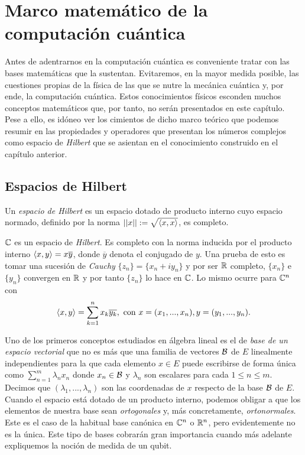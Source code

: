 \chapter{Marco matemático de la computación cuántica}

Antes de adentrarnos en la computación cuántica es conveniente tratar con las bases matemáticas que la sustentan. Evitaremos, en la mayor medida posible, las cuestiones propias de la física de las que se nutre la mecánica cuántica y, por ende, la computación cuántica. Estos conocimientos físicos esconden muchos conceptos matemáticos que, por tanto, no serán presentados en este capítulo. Pese a ello, es idóneo ver los cimientos de dicho marco teórico que podemos resumir en las propiedades y operadores que presentan los números complejos como espacio de \textit{Hilbert} que se asientan en el conocimiento construido en el capítulo anterior.

\section{Espacios de Hilbert}
\begin{definition} Un \textit{espacio de Hilbert} es un espacio dotado de producto interno cuyo espacio normado, definido por la norma $\left|\left|x\right|\right|:=\sqrt{\langle x,x\rangle}$, es completo.
\end{definition}

\begin{example} \label{ex:ex32} $\mathbb{C}$ es un espacio de \textit{Hilbert}. Es completo con la norma inducida por el producto interno $\langle x,y\rangle=x\overline{y}$, donde $\overline{y}$ denota el conjugado de $y$. Una prueba de esto es tomar una sucesión de \textit{Cauchy} $\{z_n\}=\{x_n+iy_n\}$ y por ser $\mathbb{R}$ completo, $\{x_n\}$ e $\{y_n\}$ convergen en $\mathbb{R}$ y por tanto $\{z_n\}$ lo hace en $\mathbb{C}$. Lo mismo ocurre para $\mathbb{C}^n$ con
$$\dotproduct{x}{y}=\sum^{n}_{k=1}x_k\overline{y_k},\mathrm{\ con\ } x=(x_1,...,x_n), y=(y_1,...,y_n).
$$\end{example}

Uno de los primeros conceptos estudiados en álgebra lineal es el de {\it base de un espacio vectorial} que no es más que una familia de vectores $\mathcal{B}$ de $E$ linealmente independientes para la que cada elemento $x\in E$ puede escribirse de forma única como $\sum_{n=1}^m\lambda_nx_n$ donde $x_n\in\mathcal{B}$ y $\lambda_n$ son escalares para cada $1\leq n\leq m$. Decimos que $(\lambda_1,...,\lambda_n)$ son las coordenadas de $x$ respecto de la base $\mathcal{B}$ de $E$. Cuando el espacio está dotado de un producto interno, podemos obligar a que los elementos de nuestra base sean {\it ortogonales} y, más concretamente, {\it ortonormales}. Este es el caso de la habitual base canónica en $\mathbb{C}^n$ o $\mathbb{R}^n$, pero evidentemente no es la única. Este tipo de bases cobrarán gran importancia cuando más adelante expliquemos la noción de medida de un qubit.

